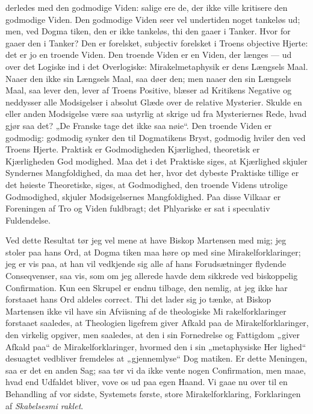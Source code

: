 \documentclass[12pt]{book}
\newcommand{\opage}[1]{\marginnote{\footnotesize\textit{[#1]}}}
\begin{document}
derledes med den godmodige Viden: salige ere de, der ikke
ville kritisere den godmodige Viden. Den godmodige Viden
seer vel undertiden noget tankeløs ud; men, ved Dogma\-%
tiken, den er ikke tankeløs, thi den gaaer i Tanker. Hvor\-%
for gaaer den i Tanker? Den er forelsket, subjectiv forelsket
i Troens objective Hjerte: det er jo en troende Viden. Den
\opage{95}\setcounter{footnote}{0}%
troende Viden er en Viden, der længes --- ud over det
Logiske ind i det Overlogiske: Mirakelmetaphysik er dens
Længsels Maal. Naaer den ikke sin Længsels Maal, saa
døer den; men naaer den sin Længsels Maal, saa lever den,
lever af Troens Positive, blæser ad Kritikens Negative og
neddysser alle Modsigelser i absolut Glæde over de relative
Mysterier. Skulde en eller anden Modsigelse være saa
ustyrlig at skrige ud fra Mysteriernes Rede, hvad gjør saa
det? „De Franske tage det ikke saa nøie“. Den troende
Viden er godmodig: godmodig synker den til Dogmatikens
Bryst, godmodig hviler den ved Troens Hjerte. Praktisk er
Godmodigheden Kjærlighed, theoretisk er Kjærligheden God\-%
modighed. Maa det i det Praktiske siges, at Kjærlighed
skjuler Syndernes Mangfoldighed, da maa det her, hvor det
dybeste Praktiske tillige er det høieste Theoretiske, siges, at
Godmodighed, den troende Videns utrolige Godmodighed,
skjuler Modsigelsernes Mangfoldighed. Paa disse Vilkaar
er Foreningen af Tro og Viden fuldbragt; det Phlyariske er
sat i speculativ Fuldendelse.

Ved dette Resultat tør jeg vel mene at have Biskop
Martensen med mig; jeg stoler paa hans Ord, at Dogma\-%
tiken maa høre op med sine Mirakelforklaringer; jeg er vis
paa, at han vil vedkjende sig alle af hans Forudsætninger
flydende Conseqvenser, saa vis, som om jeg allerede havde
dem sikkrede ved biskoppelig Confirmation. Kun een Skrupel
er endnu tilbage, den nemlig, at jeg ikke har forstaaet hans
Ord aldeles correct. Thi det lader sig jo tænke, at Biskop
Martensen ikke vil have sin Afviisning af de theologiske Mi\-%
rakelforklaringer forstaaet saaledes, at Theologien ligefrem
giver Afkald paa de Mirakelforklaringer, den virkelig opgiver, men
saaledes, at den i sin Fornedrelse og Fattigdom „giver Afkald paa“
de Mirakelforklaringer, hvormed den i sin „metaphysiske Her\-%
lighed“ desuagtet vedbliver fremdeles at „gjennemlyse“ Dog\-%
matiken. Er dette Meningen, saa er det en anden Sag; saa
\opage{96}\setcounter{footnote}{0}%
tør vi da ikke vente nogen Confirmation, men maae, hvad
end Udfaldet bliver, vove os ud paa egen Haand. Vi gaae
nu over til en Behandling af vor sidste, Systemets første,
store Mirakelforklaring, Forklaringen af \emph{Skabelsesmi\-%
raklet}.
\end{document}
